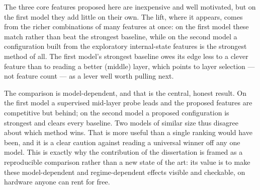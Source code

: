 The three core features proposed here are inexpensive and well motivated, but on the first
model they add little on their own. The lift, where it appears, comes from the richer
combinations of many features at once: on the first model these match rather than beat the
strongest baseline, while on the second model a configuration built from the exploratory
internal-state features is the strongest method of all. The first model's strongest baseline
owes its edge less to a clever feature than to reading a better (middle) layer, which points
to layer selection --- not feature count --- as a lever well worth pulling next.

The comparison is model-dependent, and that is the central, honest result. On the first
model a supervised mid-layer probe leads and the proposed features are competitive but
behind; on the second model a proposed configuration is strongest and clears every baseline.
Two models of similar size thus disagree about which method wins. That is more useful than a
single ranking would have been, and it is a clear caution against reading a universal winner
off any one model. This is exactly why the contribution of the dissertation is framed as a
reproducible comparison rather than a new state of the art: its value is to make these
model-dependent and regime-dependent effects visible and checkable, on hardware anyone can
rent for free.
